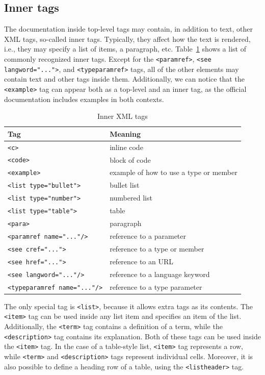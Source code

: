 \subsection{Inner tags}

\label{sec:inner-tags}

The documentation inside top-level tags may contain, in addition to text, other XML tags, so-called inner tags.
Typically, they affect how the text is rendered, i.e., they may specify a list of items, a paragraph, etc.
Table~\ref{table:inner-tags} shows a list of commonly recognized inner tags. 
Except for the \texttt{<paramref>}, \texttt{<see langword="...">}, and \texttt{<typeparamref>} tags, all of the other elements may contain text and other tags inside them.
Additionally, we can notice that the \texttt{<example>} tag can appear both as a top-level and an inner tag, as the official documentation includes examples in both contexts.

\begin{table}[h]
\centering
\begin{tabular}{|p{6cm}|p{6cm}|}
\hline
\textbf{Tag} & \textbf{Meaning} \\
\hline
\texttt{<c>} & inline code \\
\hline
\texttt{<code>} & block of code \\
\hline
\texttt{<example>} & example of how to use a type or member \\
\hline
\texttt{<list type="bullet">} & bullet list \\
\hline
\texttt{<list type="number">} & numbered list \\
\hline
\texttt{<list type="table">} & table \\
\hline
\texttt{<para>} & paragraph \\
\hline
\texttt{<paramref name="..."/>} & reference to a parameter \\
\hline
\texttt{<see cref="...">} & reference to a type or member \\
\hline
\texttt{<see href="...">} & reference to an URL \\
\hline
\texttt{<see langword="..."/>} & reference to a language keyword \\
\hline
\texttt{<typeparamref name="..."/>} & reference to a type parameter \\
\hline
\end{tabular}
\caption{Inner XML tags}
\label{table:inner-tags}
\end{table}

The only special tag is \texttt{<list>}, because it allows extra tags as its contents.
The \texttt{<item>} tag can be used inside any list item and specifies an item of the list.
Additionally, the \texttt{<term>} tag contains a definition of a term, while the \texttt{<description>} tag contains its explanation.
Both of these tags can be used inside the \texttt{<item>} tag.
In the case of a table-style list, \texttt{<item>} tag represents a row, while \texttt{<term>} and \texttt{<description>} tags represent individual cells.
Moreover, it is also possible to define a heading row of a table, using the \texttt{<listheader>} tag.


